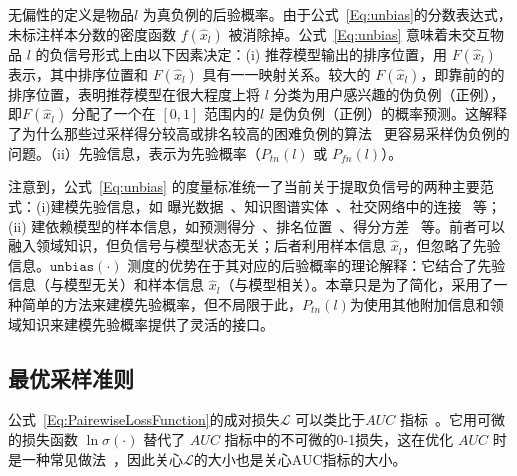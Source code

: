 
无偏性的定义是物品$l$ 为真负例的后验概率。由于公式~\eqref{Eq:unbias}的分数表达式，未标注样本分数的密度函数 $f(\hat{x}_l)$ 被消除掉。公式~\eqref{Eq:unbias} 意味着未交互物品 $l$ 的负信号形式上由以下因素决定：(i) 推荐模型输出的排序位置，用 $F(\hat{x}_l)$ 表示，其中排序位置和 $F(\hat{x}_l)$ 具有一一映射关系。较大的 $F(\hat{x}_l)$，即靠前的的排序位置，表明推荐模型在很大程度上将 $l$ 分类为用户感兴趣的伪负例（正例），即$F(\hat{x}_l)$ 分配了一个在 $[0,1]$ 范围内的$l$ 是伪负例（正例）的概率预测。这解释了为什么那些过采样得分较高或排名较高的困难负例的算法~\cite{Steffen:2014:WSDM,Zhang:2013:SIGIR} 更容易采样伪负例的问题。（ii）先验信息，表示为先验概率（$P_{tn}(l)$ 或 $P_{fn}(l)$）。

注意到，公式~\eqref{Eq:unbias} 的度量标准统一了当前关于提取负信号的两种主要范式：(i)建模先验信息，如 曝光数据~\cite{Jingtao:2019:IJCAI}、知识图谱实体~\cite{Wang:2020:WWW}、社交网络中的连接~\cite{Zhao:2014:CIKM,Wang:2016:CIKM} 等；(ii) 建依赖模型的样本信息，如预测得分~\cite{Steffen:2014:WSDM}、排名位置~\cite{Zhang:2013:SIGIR}、得分方差~\cite{Ding:2020:NIPS} 等。前者可以融入领域知识，但负信号与模型状态无关；后者利用样本信息 $\hat{x}_l$，但忽略了先验信息。$\mathtt{unbias}(\cdot)$ 测度的优势在于其对应的后验概率的理论解释：它结合了先验信息（与模型无关）和样本信息 $\hat{x}_l$（与模型相关）。本章只是为了简化，采用了一种简单的方法来建模先验概率，但不局限于此，$P_{tn}(l)$为使用其他附加信息和领域知识来建模先验概率提供了灵活的接口。

\subsection{最优采样准则}
公式~\eqref{Eq:PairewiseLossFunction}的成对损失$\mathcal{L}$ 可以类比于$AUC$ 指标~\cite{Steffen:2009:UAI}。它用可微的损失函数 $\ln \sigma(\cdot)$ 替代了 $AUC$ 指标中的不可微的0-1损失，这在优化 $AUC$ 时是一种常见做法~\cite{Herschtal:2004:ICML,Steffen:2009:UAI}，因此关心$\mathcal{L}$的大小也是关心AUC指标的大小。

